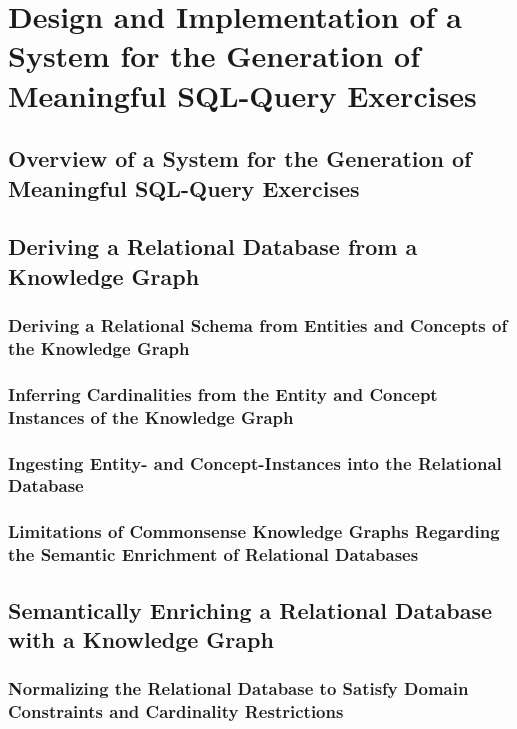 \chapter{Design and Implementation of a System for the Generation of Meaningful SQL-Query Exercises}
\label{ch:des}

\section{Overview of a System for the Generation of Meaningful SQL-Query Exercises}
\label{sec:des:overview}


\section{Deriving a Relational Database from a Knowledge Graph}
\label{sec:des:semantic}

\subsection{Deriving a Relational Schema from Entities and Concepts of the Knowledge Graph}
\label{sec:des:schema}


\subsection{Inferring Cardinalities from the Entity and Concept Instances of the Knowledge Graph}
\label{sec:des:cardinaltiy}

\subsection{Ingesting Entity- and Concept-Instances into the Relational Database}
\label{sec:des:ingestion}

\subsection{Limitations of Commonsense Knowledge Graphs Regarding the Semantic Enrichment of Relational Databases}
\label{sec:des:limits}

\section{Semantically Enriching a Relational Database with a Knowledge Graph}
\label{sec:des:semantic}

\subsection{Normalizing the Relational Database to Satisfy Domain Constraints and Cardinality Restrictions}
\label{sec:des:normal}

